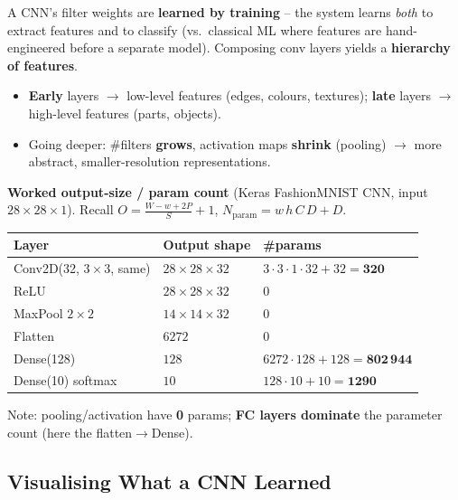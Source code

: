 \documentclass[10pt,a4paper]{article}
\begin{document}
	\begin{definitionbox}
		A CNN's filter weights are \textbf{learned by training} -- the system learns \emph{both} to extract features and to classify (vs.\ classical ML where features are hand-engineered before a separate model). Composing conv layers yields a \textbf{hierarchy of features}.
	\end{definitionbox}

	\begin{itemize}[leftmargin=*]
		\item \textbf{Early} layers $\rightarrow$ low-level features (edges, colours, textures); \textbf{late} layers $\rightarrow$ high-level features (parts, objects).
		\item Going deeper: \#filters \textbf{grows}, activation maps \textbf{shrink} (pooling) $\rightarrow$ more abstract, smaller-resolution representations.
	\end{itemize}

	\begin{examtipbox}
		\textbf{Worked output-size / param count} (Keras FashionMNIST CNN, input $28{\times}28{\times}1$). Recall $O=\frac{W-w+2P}{S}+1$, \;$N_{\text{param}}=w\,h\,C\,D+D$.
		\begin{center}\footnotesize
		\begin{tabular}{@{}lll@{}}
			\toprule
			Layer & Output shape & \#params \\
			\midrule
			Conv2D(32, $3{\times}3$, same) & $28{\times}28{\times}32$ & $3{\cdot}3{\cdot}1{\cdot}32+32=\mathbf{320}$ \\
			ReLU & $28{\times}28{\times}32$ & 0 \\
			MaxPool $2{\times}2$ & $14{\times}14{\times}32$ & 0 \\
			Flatten & $6272$ & 0 \\
			Dense(128) & $128$ & $6272{\cdot}128+128=\mathbf{802\,944}$ \\
			Dense(10) softmax & $10$ & $128{\cdot}10+10=\mathbf{1290}$ \\
			\bottomrule
		\end{tabular}
		\end{center}
		Note: pooling/activation have \textbf{0} params; \textbf{FC layers dominate} the parameter count (here the flatten$\to$Dense).
	\end{examtipbox}

	\subsection{Visualising What a CNN Learned}
\end{document}
